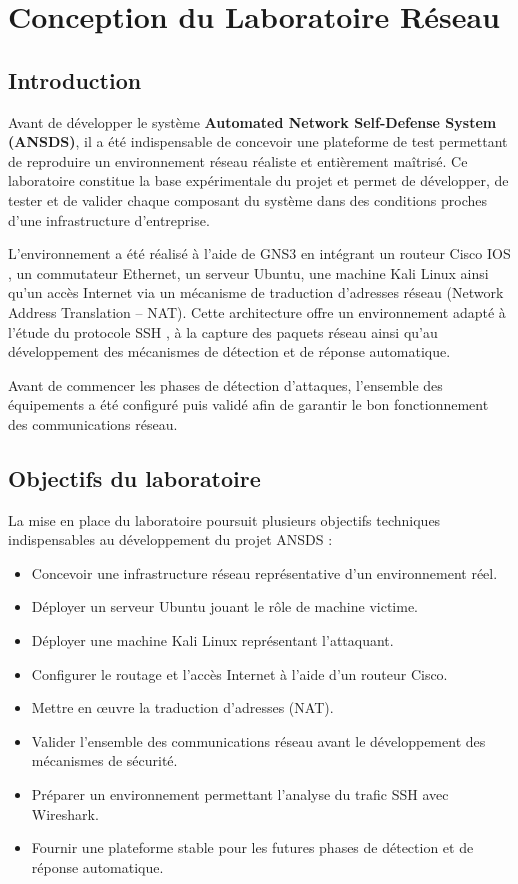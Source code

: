 \chapter{Conception du Laboratoire Réseau}

\section{Introduction}

Avant de développer le système \textbf{Automated Network Self-Defense System (ANSDS)}, il a été indispensable de concevoir une plateforme de test permettant de reproduire un environnement réseau réaliste et entièrement maîtrisé. Ce laboratoire constitue la base expérimentale du projet et permet de développer, de tester et de valider chaque composant du système dans des conditions proches d'une infrastructure d'entreprise.

L'environnement a été réalisé à l'aide de GNS3 \cite{gns3_docs} en intégrant un routeur Cisco IOS \cite{cisco_ios}, un commutateur Ethernet, un serveur Ubuntu, une machine Kali Linux ainsi qu'un accès Internet via un mécanisme de traduction d'adresses réseau (Network Address Translation -- NAT). Cette architecture offre un environnement adapté à l'étude du protocole SSH \cite{rfc4253}, à la capture des paquets réseau ainsi qu'au développement des mécanismes de détection et de réponse automatique.

Avant de commencer les phases de détection d'attaques, l'ensemble des équipements a été configuré puis validé afin de garantir le bon fonctionnement des communications réseau.

\section{Objectifs du laboratoire}

La mise en place du laboratoire poursuit plusieurs objectifs techniques indispensables au développement du projet ANSDS :

\begin{itemize}
    \item Concevoir une infrastructure réseau représentative d'un environnement réel.
    \item Déployer un serveur Ubuntu jouant le rôle de machine victime.
    \item Déployer une machine Kali Linux représentant l'attaquant.
    \item Configurer le routage et l'accès Internet à l'aide d'un routeur Cisco.
    \item Mettre en œuvre la traduction d'adresses (NAT).
    \item Valider l'ensemble des communications réseau avant le développement des mécanismes de sécurité.
    \item Préparer un environnement permettant l'analyse du trafic SSH avec Wireshark.
    \item Fournir une plateforme stable pour les futures phases de détection et de réponse automatique.
\end{itemize}

